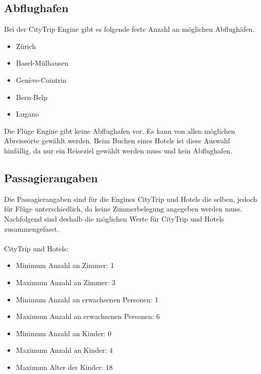 \subsection{Abflughafen}
Bei der CityTrip Engine gibt es folgende feste Anzahl an möglichen Abflughäfen.
\begin{itemize}
\item Zürich
\item Basel-Mülhausen
\item Genève-Cointrin
\item Bern-Belp
\item Lugano
\end{itemize}

Die Flüge Engine gibt keine Abflughafen vor. Es kann von allen möglichen Abreiseorte gewählt werden.
Beim Buchen eines Hotels ist diese Auswahl hinfällig, da nur ein Reiseziel gewählt werden muss und kein Abflughafen.

\subsection{Passagierangaben}
Die Passagierangaben sind für die Engines CityTrip und Hotels die selben, jedoch für Flüge unterschiedlich, da keine Zimmerbelegung angegeben werden muss. Nachfolgend sind deshalb die möglichen Werte für CityTrip und Hotels zusammengefasst.\\
\\  
\noindent CityTrip und Hotels:
\begin{itemize}
\item Minimum Anzahl an Zimmer: 1
\item Maximum Anzahl an Zimmer: 3
\item Minimum Anzahl an erwachsenen Personen: 1
\item Maximum Anzahl an erwachsenen Personen: 6
\item Minimum Anzahl an Kinder: 0
\item Maximum Anzahl an Kinder: 4
\item Maximum Alter der Kinder: 18
\end{itemize}

